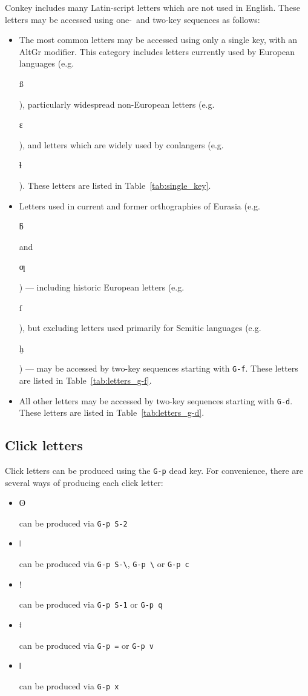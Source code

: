 \documentclass[oneside]{memoir}
\newcommand{\key}{\verb}
\newcommand{\out}[1]{\colorbox{gray!20}{\strut{}#1}}
\begin{document}
Conkey includes many Latin-script letters which are not used in English.
These letters may be accessed using one-~and two-key sequences as follows:

\begin{itemize}
\item
  The most common letters may be accessed using only a single key, with an AltGr modifier.
  This category includes letters currently used by European languages (e.g.~\out{ß}),
    particularly widespread non-European letters (e.g.~\out{ɛ}),
    and letters which are widely used by conlangers (e.g.~\out{ɬ}).
  These letters are listed in Table~\ref{tab:single_key}.
\item
  Letters used in current and former orthographies of Eurasia (e.g.~\out{ƃ} and~\out{ƣ})
    --- including historic European letters (e.g.~\out{ſ}), but excluding letters used primarily for Semitic languages (e.g.~\out{ḫ}) ---
    may be accessed by two-key sequences starting with \key|G-f|.
  These letters are listed in Table~\ref{tab:letters_g-f}.
\item
  All other letters may be accessed by two-key sequences starting with \key|G-d|.
  These letters are listed in Table~\ref{tab:letters_g-d}.
\end{itemize}



\subsection{Click letters}
\label{sec:clicks}

Click letters can be produced using the \key|G-p| dead key.
For convenience, there are several ways of producing each click letter:

\begin{itemize}[noitemsep]
\item \out{ʘ} can be produced via \key|G-p S-2|
\item \out{ǀ} can be produced via \key|G-p S-\|, \key|G-p \| or \key|G-p c|
\item \out{ǃ} can be produced via \key|G-p S-1| or \key|G-p q|
\item \out{ǂ} can be produced via \key|G-p =| or \key|G-p v|
\item \out{ǁ} can be produced via \key|G-p x|
\end{itemize}
\end{document}
